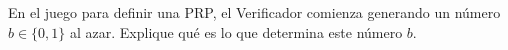 
En el juego para definir una PRP, el Verificador comienza generando un número $b\in\{0,1\}$ al azar. Explique qué es lo que determina este número $b$.
